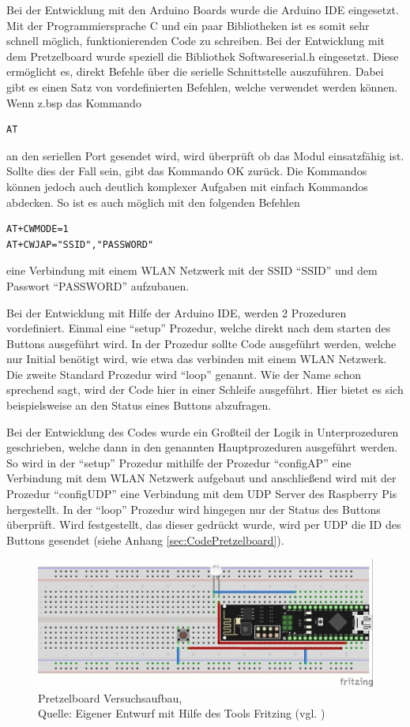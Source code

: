 Bei der Entwicklung mit den Arduino Boards wurde die Arduino IDE eingesetzt.
Mit der Programmiersprache C und ein paar Bibliotheken ist es somit sehr schnell möglich, funktionierenden Code zu schreiben.
Bei der Entwicklung mit dem Pretzelboard wurde speziell die Bibliothek Softwareserial.h eingesetzt.
Diese ermöglicht es, direkt Befehle über die serielle Schnittstelle auszuführen.
Dabei gibt es einen Satz von vordefinierten Befehlen, welche verwendet werden können.
Wenn z.bsp das Kommando 
\begin{lstlisting}
AT
\end{lstlisting}
an den seriellen Port gesendet wird, wird überprüft ob das Modul einsatzfähig ist.
Sollte dies der Fall sein, gibt das Kommando OK zurück.
Die Kommandos können jedoch auch deutlich komplexer Aufgaben mit einfach Kommandos abdecken.
So ist es auch möglich mit den folgenden Befehlen
\begin{lstlisting}
AT+CWMODE=1
AT+CWJAP="SSID","PASSWORD"
\end{lstlisting}
eine Verbindung mit einem WLAN Netzwerk mit der SSID ``SSID'' und dem Passwort ``PASSWORD'' aufzubauen.

Bei der Entwicklung mit Hilfe der Arduino IDE, werden 2 Prozeduren vordefiniert.
Einmal eine "`setup"' Prozedur, welche direkt nach dem starten des Buttons ausgeführt wird.
In der Prozedur sollte Code ausgeführt werden, welche nur Initial benötigt wird, wie etwa das verbinden mit einem WLAN Netzwerk.
Die zweite Standard Prozedur wird "`loop"' genannt.
Wie der Name schon sprechend sagt, wird der Code hier in einer Schleife ausgeführt.
Hier bietet es sich beispielsweise an den Status eines Buttons abzufragen.

Bei der Entwicklung des Codes wurde ein Großteil der Logik in Unterprozeduren geschrieben, welche dann in den genannten Hauptprozeduren ausgeführt werden.
So wird in der "`setup"' Prozedur mithilfe der Prozedur "`configAP"' eine Verbindung mit dem WLAN Netzwerk aufgebaut und anschließend wird mit der Prozedur "`configUDP"' eine Verbindung mit dem UDP Server des Raspberry Pis hergestellt.
In der "`loop"' Prozedur wird hingegen nur der Status des Buttons überprüft.
Wird festgestellt, das dieser gedrückt wurde, wird per UDP die ID des Buttons gesendet 
(siehe Anhang \ref{sec:CodePretzelboard}).

\begin{figure}[H]
	\centering
	\includegraphics[scale=1.5]{Pretzel_Fritzing.jpg}
	\caption[Pretzelboard Versuchsaufbau]{Pretzelboard Versuchsaufbau,\\ Quelle: Eigener Entwurf mit Hilfe des Tools Fritzing (vgl. \cite{.fritz})}
\end{figure}